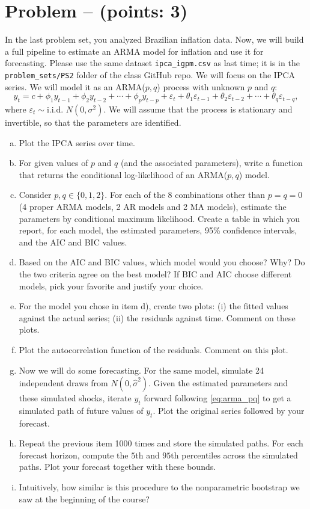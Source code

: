 \documentclass[11pt]{article}
\theoremstyle{definition}
\newcounter{problem}
\renewcommand{\theproblem}{\arabic{problem}}
\newcommand{\problem}[1]{
	\stepcounter{problem}
	\section*{Problem \theproblem{} -- (points: #1)}
}
\begin{document}
\problem{3}
In the last problem set, you analyzed Brazilian inflation data. Now, we will build a full pipeline to estimate an ARMA model for inflation and use it for forecasting. Please use the same dataset \texttt{ipca\_igpm.csv} as last time; it is in the \texttt{problem\_sets/PS2} folder of the class GitHub repo. We will focus on the IPCA series. We will model it as an ARMA($p,q$) process with unknown $p$ and $q$:
\begin{equation}
	y_t = c + \phi_1 y_{t-1} + \phi_2 y_{t-2} + \cdots + \phi_p y_{t-p} + \varepsilon_t + \theta_1 \varepsilon_{t-1} + \theta_2 \varepsilon_{t-2} + \cdots + \theta_q \varepsilon_{t-q},
	\label{eq:arma_pq}
\end{equation}
where $\varepsilon_t \sim \text{i.i.d. } N(0, \sigma^2)$. We will assume that the process is stationary and invertible, so that the parameters are identified.

\begin{enumerate}[a)]
	\item Plot the IPCA series over time.
	\item For given values of $p$ and $q$ (and the associated parameters), write a function that returns the conditional log-likelihood of an ARMA($p,q$) model.
	\item Consider $p,q \in \{0,1,2\}$. For each of the 8 combinations other than $p = q = 0$ (4 proper ARMA models, 2 AR models and 2 MA models), estimate the parameters by conditional maximum likelihood. Create a table in which you report, for each model, the estimated parameters, 95\% confidence intervals, and the AIC and BIC values.
	\item Based on the AIC and BIC values, which model would you choose? Why? Do the two criteria agree on the best model? If BIC and AIC choose different models, pick your favorite and justify your choice.
	\item For the model you chose in item d), create two plots: (i) the fitted values against the actual series; (ii) the residuals against time. Comment on these plots.
	\item Plot the autocorrelation function of the residuals. Comment on this plot.
	\item Now we will do some forecasting. For the same model, simulate 24 independent draws from $N(0, \hat{\sigma}^2)$. Given the estimated parameters and these simulated shocks, iterate $y_t$ forward following \eqref{eq:arma_pq} to get a simulated path of future values of $y_t$. Plot the original series followed by your forecast.
	\item Repeat the previous item 1000 times and store the simulated paths. For each forecast horizon, compute the $5$th and $95$th percentiles across the simulated paths. Plot your forecast together with these bounds.
	\item Intuitively, how similar is this procedure to the nonparametric bootstrap we saw at the beginning of the course?
\end{enumerate}
\end{document}
